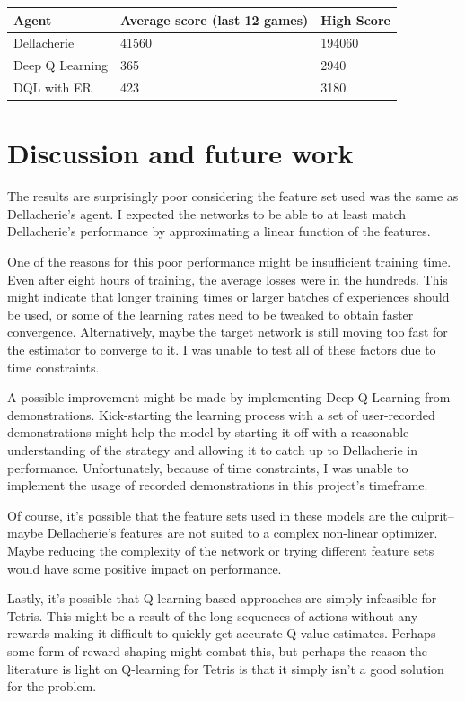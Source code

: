 \documentclass[11pt]{article}
\begin{document}
\begin{longtable}[]{@{}lll@{}}
\toprule
Agent & Average score (last 12 games) & High Score\tabularnewline
\midrule
\endhead
Dellacherie & 41560 & 194060\tabularnewline
Deep Q Learning & 365 & 2940\tabularnewline
DQL with ER & 423 & 3180\tabularnewline
\bottomrule
\end{longtable}

    \hypertarget{discussion-and-future-work}{%
\section{Discussion and future work}\label{discussion-and-future-work}}

The results are surprisingly poor considering the feature set used was
the same as Dellacherie's agent. I expected the networks to be able to
at least match Dellacherie's performance by approximating a linear
function of the features.

One of the reasons for this poor performance might be insufficient
training time. Even after eight hours of training, the average losses
were in the hundreds. This might indicate that longer training times or
larger batches of experiences should be used, or some of the learning
rates need to be tweaked to obtain faster convergence. Alternatively,
maybe the target network is still moving too fast for the estimator to
converge to it. I was unable to test all of these factors due to time
constraints.

A possible improvement might be made by implementing Deep Q-Learning
from demonstrations. Kick-starting the learning process with a set of
user-recorded demonstrations might help the model by starting it off
with a reasonable understanding of the strategy and allowing it to catch
up to Dellacherie in performance. Unfortunately, because of time
constraints, I was unable to implement the usage of recorded
demonstrations in this project's timeframe.

Of course, it's possible that the feature sets used in these models are
the culprit--maybe Dellacherie's features are not suited to a complex
non-linear optimizer. Maybe reducing the complexity of the network or
trying different feature sets would have some positive impact on
performance.

Lastly, it's possible that Q-learning based approaches are simply
infeasible for Tetris. This might be a result of the long sequences of
actions without any rewards making it difficult to quickly get accurate
Q-value estimates. Perhaps some form of reward shaping might combat
this, but perhaps the reason the literature is light on Q-learning for
Tetris is that it simply isn't a good solution for the problem.
\end{document}
